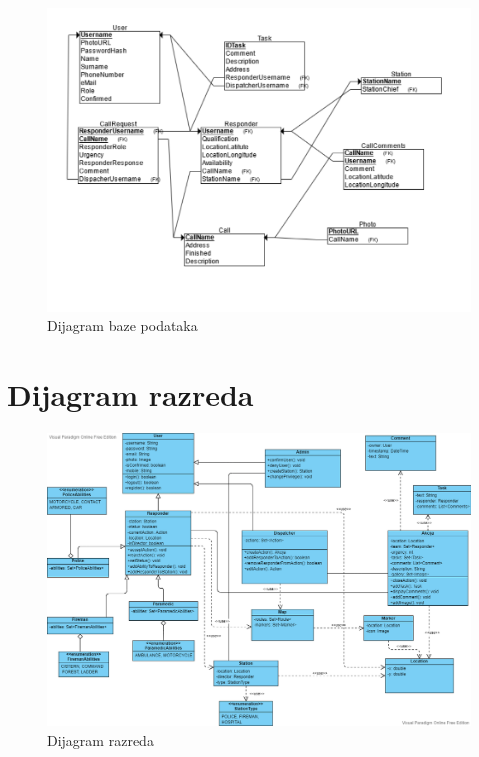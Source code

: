 				\begin{figure}[H]
					\includegraphics[scale=0.40]{slike/ModelBazePodataka.png} %
					\centering
					\caption{Dijagram baze podataka}
					\label{fig:baza podataka}
				\end{figure}
			
			\eject
			
			
		\section{Dijagram razreda}
		
			\begin{figure}[H]
				\includegraphics[scale=0.4]{slike/classes.PNG}
				\centering
				\caption{Dijagram razreda}
				\label{fig:razredi}
			\end{figure}
			
